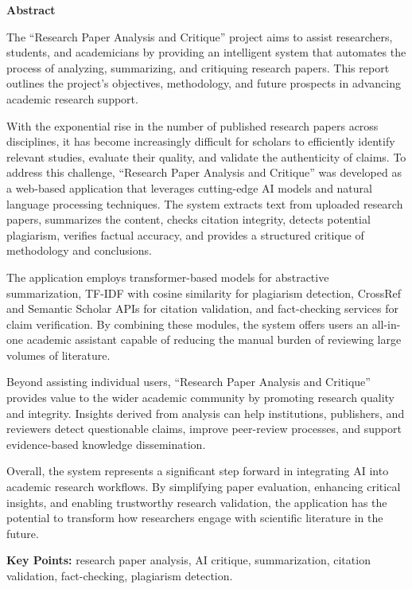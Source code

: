 \thispagestyle{empty}
\newpage
\cleardoublepage{}
{}

\begin{center}
{\Large \bf Abstract}\\
\end{center}
\vspace{10pt}

The “Research Paper Analysis and Critique” project aims to assist researchers, students, and academicians by providing an intelligent system that automates the process of analyzing, summarizing, and critiquing research papers. This report outlines the project’s objectives, methodology, and future prospects in advancing academic research support.

With the exponential rise in the number of published research papers across disciplines, it has become increasingly difficult for scholars to efficiently identify relevant studies, evaluate their quality, and validate the authenticity of claims. To address this challenge, “Research Paper Analysis and Critique” was developed as a web-based application that leverages cutting-edge AI models and natural language processing techniques. The system extracts text from uploaded research papers, summarizes the content, checks citation integrity, detects potential plagiarism, verifies factual accuracy, and provides a structured critique of methodology and conclusions.

The application employs transformer-based models for abstractive summarization, TF-IDF with cosine similarity for plagiarism detection, CrossRef and Semantic Scholar APIs for citation validation, and fact-checking services for claim verification. By combining these modules, the system offers users an all-in-one academic assistant capable of reducing the manual burden of reviewing large volumes of literature.

Beyond assisting individual users, “Research Paper Analysis and Critique” provides value to the wider academic community by promoting research quality and integrity. Insights derived from analysis can help institutions, publishers, and reviewers detect questionable claims, improve peer-review processes, and support evidence-based knowledge dissemination.

Overall, the system represents a significant step forward in integrating AI into academic research workflows. By simplifying paper evaluation, enhancing critical insights, and enabling trustworthy research validation, the application has the potential to transform how researchers engage with scientific literature in the future.

\vspace{0.5cm}
\noindent\textbf{Key Points:} research paper analysis, AI critique, summarization, citation validation, fact-checking, plagiarism detection.
